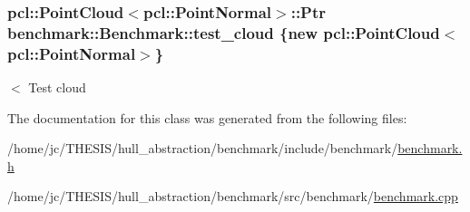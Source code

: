 \subsubsection[{\texorpdfstring{test\+\_\+cloud}{test_cloud}}]{\setlength{\rightskip}{0pt plus 5cm}pcl\+::\+Point\+Cloud$<$pcl\+::\+Point\+Normal$>$\+::Ptr benchmark\+::\+Benchmark\+::test\+\_\+cloud \{new pcl\+::\+Point\+Cloud$<$pcl\+::\+Point\+Normal$>$\}\hspace{0.3cm}{\ttfamily [private]}}\hypertarget{classbenchmark_1_1_benchmark_a9089b4dd75c60319db0450304c073828}{}\label{classbenchmark_1_1_benchmark_a9089b4dd75c60319db0450304c073828}
$<$ Test cloud 

The documentation for this class was generated from the following files\+:\begin{DoxyCompactItemize}
\item 
/home/jc/\+T\+H\+E\+S\+I\+S/hull\+\_\+abstraction/benchmark/include/benchmark/\hyperlink{benchmark_8h}{benchmark.\+h}\item 
/home/jc/\+T\+H\+E\+S\+I\+S/hull\+\_\+abstraction/benchmark/src/benchmark/\hyperlink{benchmark_8cpp}{benchmark.\+cpp}\end{DoxyCompactItemize}
